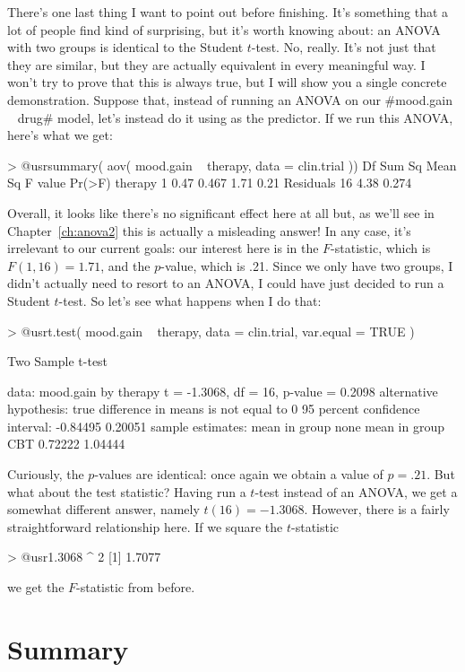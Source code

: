There's one last thing I want to point out before finishing. It's something that a lot of people find kind of surprising, but it's worth knowing about: an ANOVA with two groups is identical to the Student $t$-test. No, really. It's not just that they are similar, but they are actually equivalent in every meaningful way. I won't try to prove that this is always true, but I will show you a single concrete demonstration. Suppose that, instead of running an ANOVA on our \rtextverb#mood.gain ~ drug# model, let's instead do it using  as the predictor. If we run this ANOVA, here's what we get:
\begin{rblock1}
> @usr{summary( aov( mood.gain ~ therapy, data = clin.trial ))}
            Df Sum Sq Mean Sq F value Pr(>F)
therapy      1   0.47   0.467    1.71   0.21
Residuals   16   4.38   0.274
\end{rblock1}
Overall, it looks like there's no significant effect here at all but, as we'll see in Chapter~\ref{ch:anova2} this is actually a misleading  answer! In any case, it's irrelevant to our current goals: our interest here is in the $F$-statistic, which is $F(1,16) = 1.71$, and the $p$-value, which is .21. Since we only have two groups, I didn't actually need to resort to an ANOVA, I could have just decided to run a Student $t$-test. So let's see what happens when I do that:
\begin{rblock1}
> @usr{t.test( mood.gain ~ therapy, data = clin.trial, var.equal = TRUE )}

	Two Sample t-test

data:  mood.gain by therapy 
t = -1.3068, df = 16, p-value = 0.2098
alternative hypothesis: true difference in means is not equal to 0 
95 percent confidence interval:
 -0.84495  0.20051 
sample estimates:
mean in group none  mean in group CBT 
           0.72222            1.04444 
\end{rblock1}
Curiously, the $p$-values are identical: once again we obtain a value of $p = .21$. But what about the test statistic? Having run a $t$-test instead of an ANOVA, we get a somewhat different answer, namely $t(16) = -1.3068$. However, there is a fairly straightforward relationship here. If we square the $t$-statistic
\begin{rblock1}
> @usr{1.3068 ^ 2}
[1] 1.7077
\end{rblock1}
we get the $F$-statistic from before.




\section{Summary}

